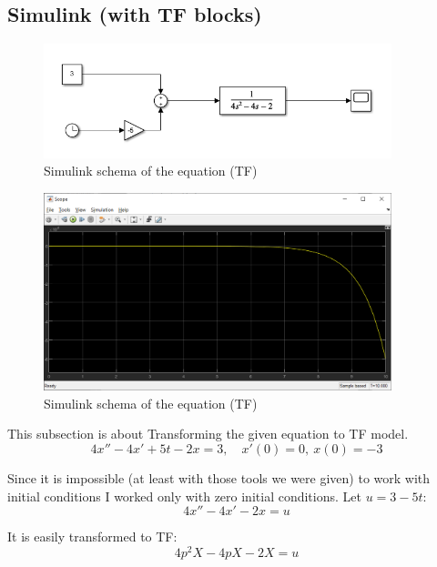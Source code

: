 \documentclass{article}
\begin{document}
    \subsection{Simulink (with TF blocks)}
    \begin{figure}[ht]
    	\centering
    	\includegraphics[width=0.9\textwidth]{images/schema2B_j.png}
    	\caption{Simulink schema of the equation (TF)}
    	\label{fig:simulink2b}
    \end{figure}
    
    \begin{figure}[ht]
    	\centering
    	\includegraphics[width=0.9\textwidth]{images/plot2B_j.png}
    	\caption{Simulink schema of the equation (TF)}
    	\label{fig:plot2b}
    \end{figure}
    
    This subsection is about Transforming the given equation to TF model.
    \begin{equation}
        4x'' - 4x' + 5t - 2x = 3, \quad x'(0) = 0, \ x(0) = -3
    \end{equation}
    
    Since it is impossible (at least with those tools we were given) to work with initial conditions I worked only with zero initial conditions. Let $u = 3 - 5t$:
    \begin{equation}
        4x'' - 4x' - 2x = u
    \end{equation}
    
    It is easily transformed to TF:
    \begin{equation}    
        4p^2 X - 4pX - 2X = u
    \end{equation}
    
\end{document}
